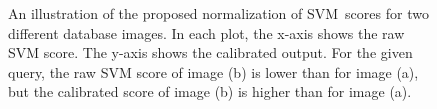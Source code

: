       \begin{figure}[t]
         \vspace{1mm}
         \vspace{1.5mm}\newline
         \vspace*{-3mm}
         \caption[]{
            An illustration of the proposed normalization of SVM~scores for two different database images. In each plot, the x-axis shows the raw SVM score. The y-axis shows the calibrated output. For the given query, the raw SVM score of image (b) is lower than for image (a), but the calibrated score of image (b) is higher than for image (a). 
         }
         \vspace*{-2mm}
         \label{fig:calib}
      \end{figure}


